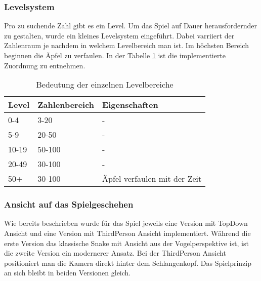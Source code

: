 \subsubsection{Levelsystem}
Pro zu suchende Zahl gibt es ein Level. Um das Spiel auf Dauer herausfordernder zu gestalten, wurde ein kleines Levelsystem eingeführt. Dabei varriiert der Zahlenraum je nachdem in welchem Levelbereich man ist. Im höchsten Bereich beginnen die Äpfel zu verfaulen. In der Tabelle \ref{tab:levels} ist die implementierte Zuordnung zu entnehmen.
\begin{table}[h!]
\centering
\begin{tabular}{|l|l|l|}
\hline
\textbf{Level} & \textbf{Zahlenbereich} & \textbf{Eigenschaften}       \\ \hline
0-4            & 3-20                   & -                            \\ \hline
5-9            & 20-50                  & -                            \\ \hline
10-19          & 50-100                 & -                            \\ \hline
20-49          & 30-100                 & -                            \\ \hline
50+            & 30-100                 & Äpfel verfaulen mit der Zeit \\ \hline
\end{tabular}
\caption{Bedeutung der einzelnen Levelbereiche\label{tab:levels}}
\end{table}
\newpage
\subsubsection{Ansicht auf das Spielgeschehen}
Wie bereits beschrieben wurde für das Spiel jeweils eine Version mit TopDown Ansicht und eine Version mit ThirdPerson Ansicht implementiert. Während die erste Version das klassische Snake mit Ansicht aus der Vogelperspektive ist, ist die zweite Version ein modernerer Ansatz. Bei der ThirdPerson Ansicht positioniert man die Kamera direkt hinter dem Schlangenkopf. Das Spielprinzip an sich bleibt in beiden Versionen gleich.


